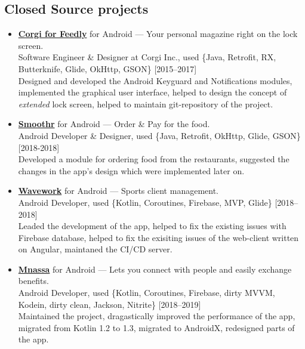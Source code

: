 \documentclass[a4paper]{article}
\begin{document}
	\subsection*{Closed Source projects}
	\begin{itemize}
		\item \faAndroid \href{http://getcorgi.com/}{\textbf{Corgi for Feedly}} for Android --- Your personal magazine right on the lock screen. \\[0.2em]
		{\footnotesize Software Engineer \& Designer at Corgi Inc., used \{Java, Retrofit, RX, Butterknife, Glide, OkHttp, GSON\} \hfill [2015--2017]} \\[0.2em]
		Designed and developed the Android Keyguard and Notifications modules, implemented the graphical user interface, helped to design the concept of \textit{extended} lock screen, helped to maintain git-repository of the project.

		\item \faAndroid \href{https://play.google.com/store/apps/details?id=de.sterlix.smoothr}{\textbf{Smoothr}} for Android --- Order \& Pay for the food. \\[0.2em]
		{\footnotesize Android Developer \& Designer, used \{Java, Retrofit, OkHttp, Glide, GSON\} \hfill [2018-2018]} \\[0.2em]
		Developed a module for ordering food from the restaurants, suggested the changes in the app's design which were implemented later on. 
		
		\item \faAndroid \href{https://wavework.com/}{\textbf{Wavework}} for Android --- Sports client management. \\[0.2em]
		{\footnotesize Android Developer, used \{Kotlin, Coroutines, Firebase, MVP, Glide\} \hfill [2018--2018]} \\[0.2em]
		Leaded the development of the app, helped to fix the existing issues with Firebase database, helped to fix the exisiting issues of the web-client written on Angular, maintaned the CI/CD server.
		
		\item \faAndroid \href{https://play.google.com/store/apps/details?id=com.mnassa}{\textbf{Mnassa}} for Android --- Lets you connect with people and easily exchange benefits. \\[0.2em]
		{\footnotesize Android Developer, used \{Kotlin, Coroutines, Firebase, dirty MVVM, Kodein, dirty clean, Jackson, Nitrite\} \hfill [2018--2019]} \\[0.2em]
		Maintained the project, dragastically improved the performance of the app, migrated from Kotlin 1.2 to 1.3, migrated to AndroidX, redesigned parts of the app.

	\end{itemize}
\end{document}
